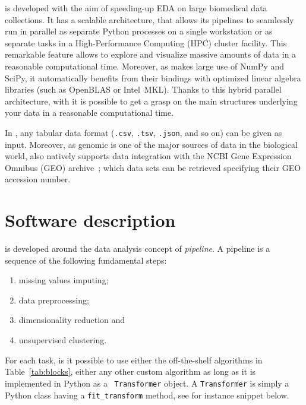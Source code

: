 \ade is developed with the aim of speeding-up EDA on large biomedical data collections.
It has a scalable architecture, that allows its pipelines to seamlessly run in parallel as separate Python processes on a single workstation or as 
separate tasks in a High-Performance Computing (HPC) cluster facility. This remarkable feature allows to explore and visualize massive amounts of data in a reasonable computational time.
Moreover, as \ade makes large use of {\sc NumPy} and {\sc SciPy}, it automatically benefits from their bindings with optimized linear algebra libraries (such as OpenBLAS or Intel\textsuperscript{\textregistered}~MKL).
Thanks to this hybrid parallel architecture, with \ade it is possible to get a grasp on the main structures underlying your data in a reasonable computational time.

In \ade, any tabular data format ({\tt .csv}, {\tt .tsv}, {\tt .json}, and so on) can be given as input. Moreover, as genomic is one of the major sources of data in the biological world, \ade also natively supports data integration with the NCBI Gene Expression Omnibus (GEO) archive~\cite{barrett2013ncbi}; which data sets can be retrieved specifying their GEO accession number.


\section{Software description} \label{sec:adenine_implementation}
\ade is developed around the data analysis concept of \emph{pipeline}. A pipeline is a sequence of the following fundamental steps:
\begin{enumerate}
  \item missing values imputing;
  \item data preprocessing;
  \item dimensionality reduction and
  \item unsupervised clustering.
\end{enumerate}
For each task, is it possible to use either the off-the-shelf algorithms in Table~\ref{tab:blocks}, either any other custom algorithm as long as it is implemented in Python as a \sklearn~{\tt Transformer} object. A {\tt Transformer} is simply a Python class having a {\tt fit\_transform} method, see for instance snippet below.

